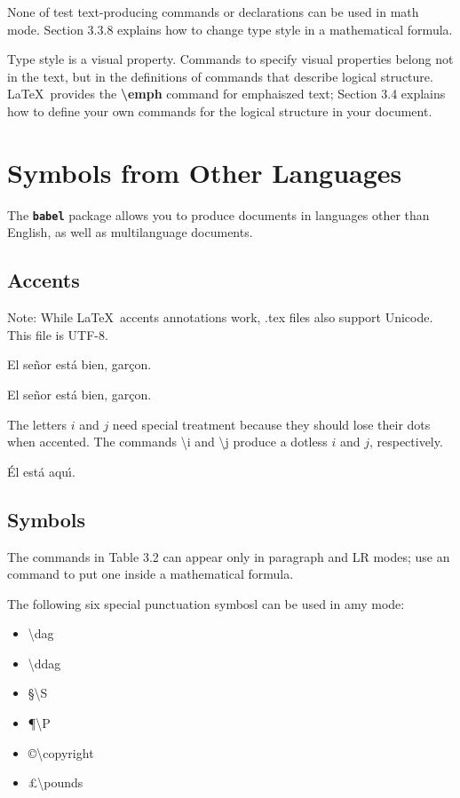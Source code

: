 \documentclass[twocolumn]{book}        %
\begin{document}
None of test text-producing commands or declarations can be used in math mode.
Section 3.3.8 explains how to change type style in a mathematical formula.

Type style is a visual property.
Commands to specify visual properties belong not in the text, but in the 
definitions of commands that describe logical structure.
\LaTeX\ provides the \textbf{\textbackslash emph} command for emphaiszed text;
Section 3.4 explains how to define your own commands for the logical structure in your document.

\section{Symbols from Other Languages}

The \textbf{\tt babel} package allows you to produce documents in languages other than English,
as well as multilanguage documents.

\subsection{Accents}

Note: While \LaTeX\ accents annotations work, .tex files also support Unicode.
This file is UTF-8.

El se\~{n}or est\'{a} bien, gar\c{c}on.

El señor está bien, garçon.

The letters $i$ and $j$ need special treatment because they should lose their dots when accented.
The commands \textbackslash i and \textbackslash j produce a dotless $i$ and $j$, respectively.

\'{E}l est\'{a} aqu\'{\i}.

\subsection{Symbols}

The commands in Table 3.2 can appear only in paragraph and LR modes; use an \mbox command to 
put one inside a mathematical formula.

The following six special punctuation symbosl can be used in amy mode:

\begin{itemize}
    \item \dag \textbackslash dag 
    \item \ddag \textbackslash ddag
    \item \S \textbackslash S
    \item \P \textbackslash P 
    \item \copyright \textbackslash copyright
    \item \pounds \textbackslash pounds
\end{itemize}
\end{document}

